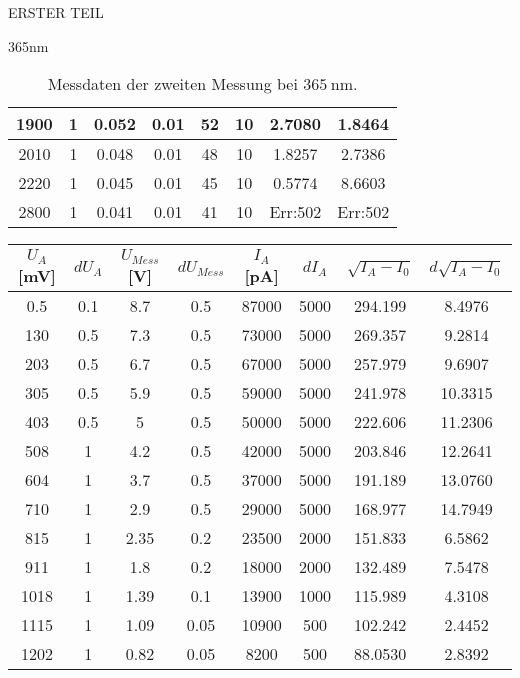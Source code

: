\begin{appendix}
\begin{chapter}{ERSTER TEIL}
\begin{section}{365nm}
\begin{table}[htbp]
\begin{tabular}{|c|c|c|c|c|c|c|c|}
            1900 & 1 & 0.052 & 0.01 & 52 & 10 & 2.7080 & 1.8464 \\ \hline
            2010 & 1 & 0.048 & 0.01 & 48 & 10 & 1.8257 & 2.7386 \\ \hline
            2220 & 1 & 0.045 & 0.01 & 45 & 10 & 0.5774 & 8.6603 \\ \hline
            2800 & 1 & 0.041 & 0.01 & 41 & 10 & Err:502 & Err:502 \\ \hline
          \end{tabular}
          \caption{Messdaten der zweiten Messung bei $\SI{365}{\nano\meter}$.}
          \label{tab:365_2}
        \end{table}
        
        \begin{table}[htbp]
          \centering
          \scriptsize
          \begin{tabular}{|c|c|c|c|c|c|c|c|}
            \hline
            $U_{A}$ [mV] & $dU_{A}$ & $U_{Mess}$ [V] & $dU_{Mess}$ & 
                $I_{A}$ [pA] & $dI_{A}$ & $\sqrt{I_{A}-I_0}$ & 
                $d\sqrt{I_{A}-I_0}$ \\ \hline
            0.5 & 0.1 & 8.7 & 0.5 & 87000 & 5000 & 294.199 & 8.4976 \\ \hline
            130 & 0.5 & 7.3 & 0.5 & 73000 & 5000 & 269.357 & 9.2814 \\ \hline
            203 & 0.5 & 6.7 & 0.5 & 67000 & 5000 & 257.979 & 9.6907 \\ \hline
            305 & 0.5 & 5.9 & 0.5 & 59000 & 5000 & 241.978 & 10.3315 \\ \hline
            403 & 0.5 & 5 & 0.5 & 50000 & 5000 & 222.606 & 11.2306 \\ \hline
            508 & 1 & 4.2 & 0.5 & 42000 & 5000 & 203.846 & 12.2641 \\ \hline
            604 & 1 & 3.7 & 0.5 & 37000 & 5000 & 191.189 & 13.0760 \\ \hline
            710 & 1 & 2.9 & 0.5 & 29000 & 5000 & 168.977 & 14.7949 \\ \hline
            815 & 1 & 2.35 & 0.2 & 23500 & 2000 & 151.833 & 6.5862 \\ \hline
            911 & 1 & 1.8 & 0.2 & 18000 & 2000 & 132.489 & 7.5478 \\ \hline
            1018 & 1 & 1.39 & 0.1 & 13900 & 1000 & 115.989 & 4.3108 \\ \hline
            1115 & 1 & 1.09 & 0.05 & 10900 & 500 & 102.242 & 2.4452 \\ \hline
            1202 & 1 & 0.82 & 0.05 & 8200 & 500 & 88.0530 & 2.8392 \\ \hline

\end{tabular}
\end{table}
\end{section}
\end{chapter}
\end{appendix}

